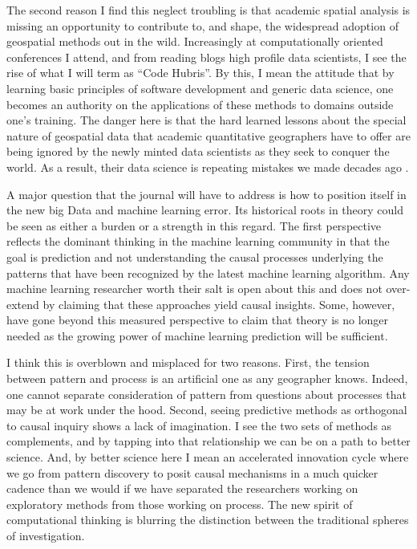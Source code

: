 \documentclass[11pt]{article}
\begin{document}
The second reason I find this neglect troubling is that academic spatial
analysis is missing an opportunity to contribute to, and shape, the widespread
adoption of geospatial methods out in the wild. Increasingly at computationally
oriented conferences I attend, and from reading blogs high profile data
scientists, I see the rise of what I will term as ``Code Hubris''. By this, I
mean the attitude that by learning basic principles of software development and
generic data science, one becomes an authority on the applications of these
methods to domains outside one's training. The danger here is that the hard
learned lessons about the special nature of geospatial data that academic
quantitative geographers have to offer are being ignored by the newly minted data
scientists as they seek to conquer the world. As a result, their data science is
repeating mistakes we made decades ago \cite{Arribas_Bel_2018}.

A major question that the journal will have to address is
how to position itself in the new big Data and machine learning error. Its
historical roots in theory \cite{Golledge_2010} could be seen as either a burden
or a strength in this regard. The first perspective reflects the dominant
thinking in the machine learning community in that the goal is prediction and
not understanding the causal processes underlying the patterns that have been
recognized by the latest machine learning algorithm. Any machine learning
researcher worth their salt is open about this and does not over-extend by
claiming that these approaches yield causal insights. Some, however, have gone
beyond this measured perspective to claim that theory is no longer needed as the
growing power of machine learning prediction will be sufficient\cite{anserson_2006_eot}.

I think this is overblown and misplaced for two reasons. First, the tension
between pattern and process is an artificial one as any geographer knows. Indeed,
one cannot separate consideration of pattern from questions about processes that
may be at work under the hood. Second, seeing predictive methods as orthogonal
to causal inquiry shows a lack of imagination. I see the two sets of methods as
complements, and by tapping into that relationship we can be on a path to better
science. And, by better science here I mean an accelerated innovation cycle where we
go from pattern discovery to posit causal mechanisms in a much quicker cadence
than we would if we have separated the researchers working on exploratory
methods from those working on process. The new spirit of computational thinking
is blurring the distinction between the traditional spheres of investigation.
\end{document}
